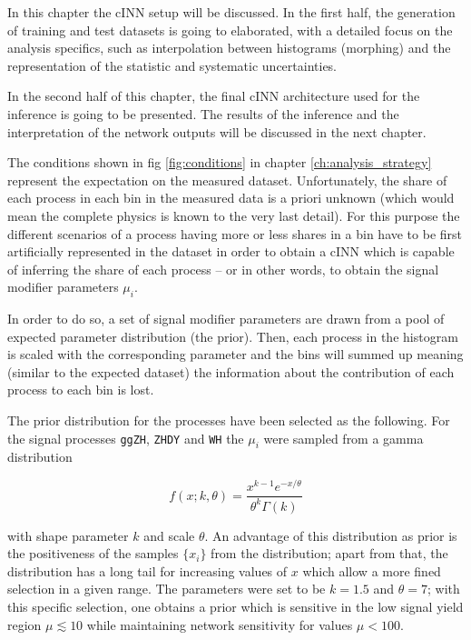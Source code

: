 
In this chapter the cINN setup will be discussed. In the first half, the generation of training and test datasets is going to elaborated, with a detailed focus on the analysis specifics, such as interpolation between histograms (morphing) and the representation of the statistic and systematic uncertainties.

In the second half of this chapter, the final cINN architecture used for the inference is going to be presented. The results of the inference and the interpretation of the network outputs will be discussed in the next chapter.


The conditions shown in fig \ref{fig:conditions} in chapter \ref{ch:analysis_strategy} represent the expectation on the measured dataset. Unfortunately, the share of each process in each bin in the measured data is a priori unknown (which would mean the complete physics is known to the very last detail). For this purpose the different scenarios of a process having more or less shares in a bin have to be first artificially represented in the dataset in order to obtain a cINN which is capable of inferring the share of each process -- or in other words, to obtain the signal modifier parameters $\mu_i$.


In order to do so, a set of signal modifier parameters are drawn from a pool of expected parameter distribution (the prior). Then, each process in the histogram is scaled with the corresponding parameter and the bins will summed up meaning (similar to the expected dataset) the information about the contribution of each process to each bin is lost.

The prior distribution for the processes have been selected as the following. For the signal processes \texttt{ggZH}, \texttt{ZHDY} and \texttt{WH} the $\mu_i$ were sampled from a gamma distribution

\begin{equation*}
	f(x; k, \theta) = \frac{x^{k-1}e^{-x/\theta}}{\theta^k\Gamma(k)}
\end{equation*}

with shape parameter $k$ and scale $\theta$. An advantage of this distribution as prior is the positiveness of the samples $\{x_i\}$ from the distribution; apart from that, the distribution has a long tail for increasing values of $x$ which allow a more fined selection in a given range. The parameters were set to be $k = 1.5$ and $\theta = 7$; with this specific selection, one obtains a prior which is sensitive in the low signal yield region $\mu \lesssim 10$ while maintaining network sensitivity for values $\mu<100$.

